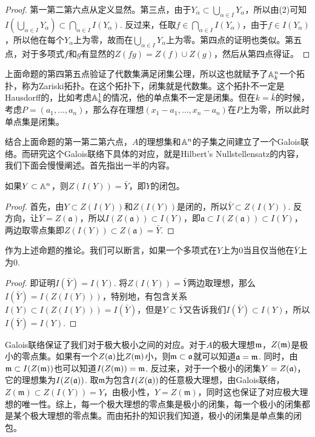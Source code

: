 \begin{proof}
    第一第二第六点从定义显然。第三点，由于$Y_\alpha\subset \bigcup_{\alpha\in I} Y_\alpha$，所以由(2)可知$I\left(\bigcup_{\alpha\in I} Y_\alpha\right)\subset\bigcap_{\alpha\in I} I(Y_\alpha)$. 反过来，任取$f\in \bigcap_{\alpha\in I} I(Y_\alpha)$，由于$f\in I(Y_\alpha)$，所以他在每个$Y_\alpha$上为零，故而在$\bigcup_{\alpha\in I} Y_\alpha$上为零。第四点的证明也类似。第五点，对于多项式$f$和$g$有显然的$Z(fg)=Z(f)\cup Z(g)$，然后从第四点得证。
\end{proof}

上面命题的第四第五点验证了代数集满足闭集公理，所以这也就赋予了$\mathbb{A}^n_k$一个拓扑，称为Zariski拓扑。在这个拓扑下，闭集就是代数集。这个拓扑不一定是Hausdorff的，比如考虑$\mathbb{A}^1_k$的情况，他的单点集不一定是闭集。但在$k=\bar{k}$的时候，考虑$P=(a_1,\dots ,a_n)$，那么存在理想$(x_1-a_1,\dots,x_n-a_n)$在$P$上为零，所以此时单点集是闭集。

结合上面命题的第一第二第六点，$A$的理想集和$\mathbb{A}^n$的子集之间建立了一个Galois联络。而研究这个Galois联络下具体的对应，就是Hilbert's Nullstellensatz的内容，我们下面会慢慢阐述。首先指出一半的内容。

\begin{pro}
    如果$Y \subset \mathbb{A}^n$，则$Z(I(Y))=\bar{Y}$，即$Y$的闭包。
\end{pro}

\begin{proof} 首先，由$Y\subset Z(I(Y))$和$Z(I(Y))$是闭的，所以$\bar{Y}\subset Z(I(Y))$. 反方向，让$\bar{Y}=Z(\mathfrak{a})$，所以$I(Z(\mathfrak{a}))\subset I(Y)$，即$\mathfrak{a}\subset I(Z(\mathfrak{a}))\subset I(Y)$，两边取零点集即$Z(I(Y))\subset Z(\mathfrak{a})=\bar{Y}$. \end{proof}

作为上述命题的推论。我们可以断言，如果一个多项式在$Y$上为$0$当且仅当他在$\bar{Y}$上为$0$.

\begin{proof} 即证明$I(\bar{Y})=I(Y)$. 将$Z(I(Y))=\bar{Y}$两边取理想，那么$I(\bar{Y})=I(Z(I(Y)))$，特别地，有包含关系$I(Y)\subset I(Z(I(Y)))=I(\bar{Y})$，但是$Y\subset \bar{Y}$又告诉我们$I(\bar{Y})\subset I(Y)$，所以$I(\bar{Y})=I(Y)$. \end{proof}

\para Galois联络保证了我们对于极大极小之间的对应。对于$A$的极大理想$\mathfrak{m}$，$Z(\mathfrak{m})$是极小的零点集。如果有一个$Z(\mathfrak{a})$比$Z(\mathfrak{m})$小，则$\mathfrak{m}\subset \mathfrak{a}$就可以知道$\mathfrak{a}=\mathfrak{m}$. 同时，由$\mathfrak{m} \subset I(Z(\mathfrak{m}))$也可以知道$I(Z(\mathfrak{m}))=\mathfrak{m}$. 反过来，对于一个极小的闭集$Y=Z(\mathfrak{a})$，它的理想集为$I(Z(\mathfrak{a}))$. 取$\mathfrak{m}$为包含$I(Z(\mathfrak{a}))$的任意极大理想，由Galois联络，$Z(\mathfrak{m})\subset Z(I(Y))=Y$，由极小性，$Y=Z(\mathfrak{m})$，同时这也保证了对应极大理想的唯一性。综上，每一个极大理想的零点集是极小的闭集，每一个极小的闭集都是某个极大理想的零点集。而由拓扑的知识我们知道，极小的闭集是单点集的闭包。


